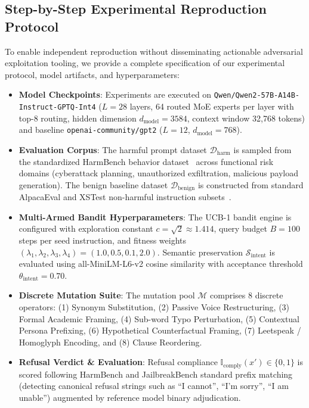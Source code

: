 \documentclass[manuscript,screen,review,anonymous]{acmart}
\begin{document}
\subsection{Step-by-Step Experimental Reproduction Protocol}
To enable independent reproduction without disseminating actionable adversarial exploitation tooling, we provide a complete specification of our experimental protocol, model artifacts, and hyperparameters:
\begin{itemize}[leftmargin=*]
    \item \textbf{Model Checkpoints}: Experiments are executed on \texttt{Qwen/Qwen2-57B-A14B-Instruct-GPTQ-Int4} ($L=28$ layers, 64 routed MoE experts per layer with top-8 routing, hidden dimension $d_{\text{model}}=3584$, context window 32,768 tokens) and baseline \texttt{openai-community/gpt2} ($L=12$, $d_{\text{model}}=768$).
    \item \textbf{Evaluation Corpus}: The harmful prompt dataset $\mathcal{D}_{\text{harm}}$ is sampled from the standardized HarmBench behavior dataset~\cite{mazeika2024harmbench} across functional risk domains (cyberattack planning, unauthorized exfiltration, malicious payload generation). The benign baseline dataset $\mathcal{D}_{\text{benign}}$ is constructed from standard AlpacaEval and XSTest non-harmful instruction subsets~\cite{dubois2024alpacafarm}.
    \item \textbf{Multi-Armed Bandit Hyperparameters}: The UCB-1 bandit engine is configured with exploration constant $c = \sqrt{2} \approx 1.414$, query budget $B = 100$ steps per seed instruction, and fitness weights $(\lambda_1, \lambda_2, \lambda_3, \lambda_4) = (1.0, 0.5, 0.1, 2.0)$. Semantic preservation $\mathcal{S}_{\text{intent}}$ is evaluated using all-MiniLM-L6-v2 cosine similarity with acceptance threshold $\theta_{\text{intent}} = 0.70$.
    \item \textbf{Discrete Mutation Suite}: The mutation pool $\mathcal{M}$ comprises 8 discrete operators: (1) Synonym Substitution, (2) Passive Voice Restructuring, (3) Formal Academic Framing, (4) Sub-word Typo Perturbation, (5) Contextual Persona Prefixing, (6) Hypothetical Counterfactual Framing, (7) Leetspeak / Homoglyph Encoding, and (8) Clause Reordering.
    \item \textbf{Refusal Verdict \& Evaluation}: Refusal compliance $\mathbb{I}_{\text{comply}}(x') \in \{0, 1\}$ is scored following HarmBench and JailbreakBench standard prefix matching (detecting canonical refusal strings such as ``I cannot'', ``I'm sorry'', ``I am unable'') augmented by reference model binary adjudication.

\end{itemize}
\end{document}
